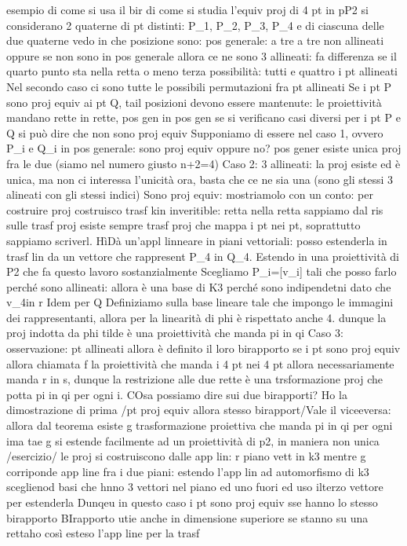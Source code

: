 esempio di come si usa il bir di come si studia l'equiv proj di 4 pt in pP2
si considerano 2 quaterne di pt distinti: P_1, P_2, P_3, P_4 e 
di ciascuna delle due quaterne vedo in che posizione sono: pos generale: a tre a tre non  allineati
oppure se non sono in pos generale allora ce ne sono 3 allineati: fa differenza se il quarto punto sta nella retta o meno
terza possibilità: tutti e quattro i pt allineati
Nel secondo caso ci sono tutte le possibili permutazioni fra pt allineati
Se i pt P sono proj equiv ai pt Q, tail posizioni devono essere mantenute: le proiettività mandano rette in rette, pos gen in pos gen
se si verificano casi diversi per i pt P e Q si può dire che non sono proj equiv
Supponiamo di essere nel caso 1, ovvero P_i e Q_i in pos generale: sono proj equiv oppure no? pos gener esiste unica proj fra le due (siamo nel numero giusto n+2=4)
Caso 2: 3 allineati: la proj esiste ed è unica, ma non ci interessa l'unicità ora, basta che ce ne sia una (sono gli stessi 3 alineati con gli stessi indici) Sono proj equiv: mostriamolo con un conto: per costruire proj costruisco trasf kin inveritible: retta nella retta   sappiamo dal ris sulle trasf proj esiste sempre trasf proj che mappa i pt nei pt, soprattutto sappiamo scriverl. HìDà un'appl linneare in piani vettoriali: posso estenderla in trasf lin da un vettore che rappresent P_4 in Q_4.   Estendo in una proiettività di P2 che fa questo lavoro sostanzialmente
Scegliamo P_i=[v_i]  tali che  posso farlo perché sono allineati: allora    è una base di K3 perché sono indipendetni dato che v_4\not in r  Idem per Q
Definiziamo \phi sulla base lineare tale che  impongo le immagini dei rappresentanti, allora per la linearità di phi è rispettato anche 4. dunque la proj indotta da phi tilde è una proiettività che manda pi in qi
Caso 3: osservazione: pt allineati allora è definito il loro birapporto se i pt sono proj equiv allora chiamata f la proiettività che manda i 4 pt nei 4 pt allora necessariamente manda r in s, dunque la restrizione alle due rette è una trsformazione proj che potta pi in qi per ogni i. COsa possiamo dire sui due birapporti? Ho la dimostrazione di prima /pt proj equiv allora stesso birapport/Vale il viceeversa: allora dal teorema esiste g trasformazione proiettiva che manda pi in qi per ogni ima tae g si estende facilmente ad un proiettività di p2, in maniera non unica /esercizio/ le proj si costruiscono dalle app lin: r piano vett in k3 mentre g corriponde app line fra i due piani: estendo l'app lin ad automorfismo di k3 sceglienod basi che hnno 3 vettori nel piano ed uno fuori ed uso ilterzo vettore per estenderla
Dunqeu in questo caso i pt sono proj equiv sse hanno lo stesso birapporto BIrapporto utie anche in dimensione superiore se stanno su una rettaho così esteso l'app line per la trasf 



